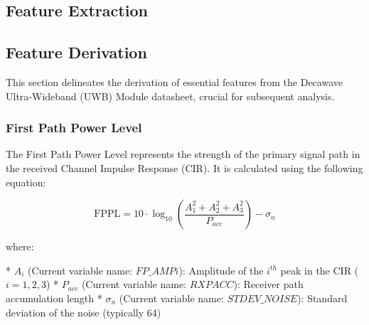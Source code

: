 \documentclass[
	article, %
	11pt, %
]{CSUniSchoolLabReport}
\begin{document}

\subsection{Feature Extraction}\label{feature_extraction}


\subsection{Feature Derivation}\label{feature_derivation}

This section delineates the derivation of essential features from the Decawave Ultra-Wideband (UWB) Module datasheet, crucial for subsequent analysis.

\subsubsection{First Path Power Level}\label{first_path_power_level}

The First Path Power Level represents the strength of the primary signal path in the received Channel Impulse Response (CIR). It is calculated using the following equation:

\begin{equation}
  \text{FPPL} = 10 \cdot \log_{10} \left( \frac{A_1^2 + A_2^2 + A_3^2}{P_{acc}} \right) - \sigma_n
\end{equation}

where:

* $A_i$ (Current variable name: $FP\_AMPi$): Amplitude of the $i^{th}$ peak in the CIR ($i = 1, 2, 3$)
* $P_{acc}$ (Current variable name: $RXPACC$): Receiver path accumulation length
* $\sigma_n$ (Current variable name: $STDEV\_NOISE$): Standard deviation of the noise (typically 64)
\end{document}
